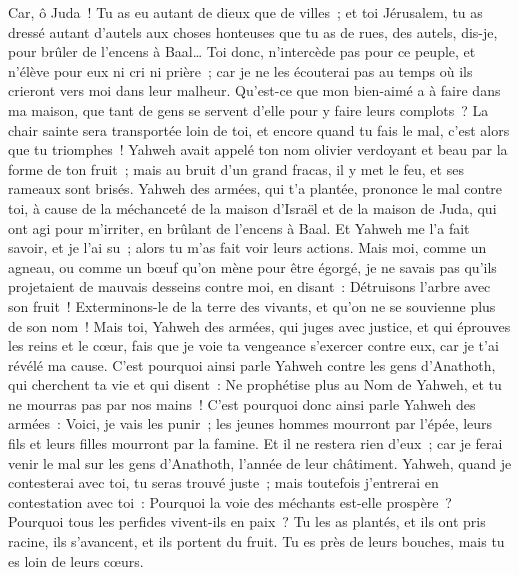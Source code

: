 \begin{multicols}{2}
Car, ô Juda~! Tu as eu autant de dieux que de villes~; et toi Jérusalem, tu as dressé autant d'autels aux choses honteuses que tu as de rues, des autels, dis-je, pour brûler de l'encens à Baal…
Toi donc, n'intercède pas pour ce peuple, et n'élève pour eux ni cri ni prière~; car je ne les écouterai pas au temps où ils crieront vers moi dans leur malheur.
Qu'est-ce que mon bien-aimé a à faire dans ma maison, que tant de gens se servent d'elle pour y faire leurs complots~? La chair sainte sera transportée loin de toi, et encore quand tu fais le mal, c'est alors que tu triomphes~!
Yahweh avait appelé ton nom olivier verdoyant et beau par la forme de ton fruit~; mais au bruit d'un grand fracas, il y met le feu, et ses rameaux sont brisés.
Yahweh des armées, qui t'a plantée, prononce le mal contre toi, à cause de la méchanceté de la maison d'Israël et de la maison de Juda, qui ont agi pour m'irriter, en brûlant de l'encens à Baal.
Et Yahweh me l'a fait savoir, et je l'ai su~; alors tu m'as fait voir leurs actions.
Mais moi, comme un agneau, ou comme un bœuf qu'on mène pour être égorgé, je ne savais pas qu'ils projetaient de mauvais desseins contre moi, en disant~: Détruisons l'arbre avec son fruit~! Exterminons-le de la terre des vivants, et qu'on ne se souvienne plus de son nom~!
Mais toi, Yahweh des armées, qui juges avec justice, et qui éprouves les reins et le cœur, fais que je voie ta vengeance s'exercer contre eux, car je t'ai révélé ma cause.
C'est pourquoi ainsi parle Yahweh contre les gens d'Anathoth, qui cherchent ta vie et qui disent~: Ne prophétise plus au Nom de Yahweh, et tu ne mourras pas par nos mains~!
C'est pourquoi donc ainsi parle Yahweh des armées~: Voici, je vais les punir~; les jeunes hommes mourront par l'épée, leurs fils et leurs filles mourront par la famine.
Et il ne restera rien d'eux~; car je ferai venir le mal sur les gens d'Anathoth, l'année de leur châtiment.
\VerseOne{}Yahweh, quand je contesterai avec toi, tu seras trouvé juste~; mais toutefois j'entrerai en contestation avec toi~: Pourquoi la voie des méchants est-elle prospère~? Pourquoi tous les perfides vivent-ils en paix~?
Tu les as plantés, et ils ont pris racine, ils s'avancent, et ils portent du fruit. Tu es près de leurs bouches, mais tu es loin de leurs cœurs.

\end{multicols}
